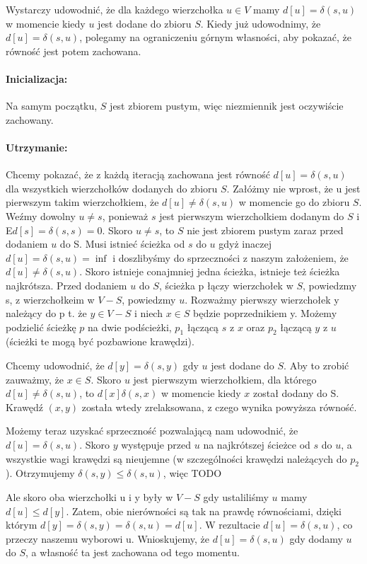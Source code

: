 Wystarczy udowodnić, że dla każdego wierzchołka $u \in V$ mamy $d[u] = \delta(s, u)$ w momencie
kiedy $u$ jest dodane do zbioru $S$. Kiedy już udowodnimy, że $d[u] = \delta(s, u)$,
polegamy na ograniczeniu górnym własności, aby pokazać, że równość jest potem zachowana.

\paragraph{Inicializacja:} Na samym początku, $S$ jest zbiorem pustym, więc niezmiennik jest oczywiście
zachowany.

\paragraph{Utrzymanie:} Chcemy pokazać, że z każdą iteracją zachowana jest równość $d[u] = \delta(s, u)$
dla wszystkich wierzchołków dodanych do zbioru $S$. Załóżmy nie wprost, że u jest
pierwszym takim wierzchołkiem, że $d[u] \ne \delta(s,u)$ w momencie go do zbioru
$S$. Weźmy dowolny $u \ne s$, ponieważ  $s$ jest pierwszym wierzcholkiem dodanym
do $S$ i E$d[s] = \delta(s,s) = 0$. Skoro $u \ne s$, to $S$ nie jest zbiorem pustym
zaraz przed dodaniem $u$ do S. Musi istnieć ścieżka od $s$ do $u$ gdyż inaczej
$d[u] = \delta(s,u) = \inf$ i doszlibyśmy do sprzeczności z naszym założeniem, że
$d[u] \ne \delta(s, u)$. Skoro istnieje conajmniej jedna ścieżka, istnieje też ścieżka
najkrótsza. Przed dodaniem $u$ do $S$, ścieżka p łączy wierzchołek w $S$, powiedzmy s,
z wierzchołkeim w $V - S$, powiedzmy $u$. Rozważmy pierwszy wierzchołek y należący do p
t. że $y \in V - S$ i niech $x \in S$ będzie poprzednikiem y. Możemy podzielić ścieżkę
$p$ na dwie podścieżki, $p_1$ łączącą $s$ z $x$ oraz $p_2$ łączącą $y$ z $u$
(ścieżki te mogą być pozbawione krawędzi).

Chcemy udowodnić, że $d[y] = \delta(s,y)$ gdy $u$ jest dodane do $S$. Aby to zrobić
zauważmy, że $x \in S$. Skoro $u$ jest pierwszym wierzchołkiem, dla którego $d[u] \ne \delta(s,u)$,
to $d[x] \delta(s,x)$ w momencie kiedy $x$ został dodany do S. Krawędź $(x, y)$
została wtedy zrelaksowana, z czego wynika powyższa równość.

Możemy teraz uzyskać sprzeczność pozwalającą nam udowodnić, że $d[u] = \delta(s,u)$.
Skoro $y$ występuje przed $u$ na najkrótszej ścieżce od $s$ do $u$, a wszystkie
wagi krawędzi są nieujemne (w szczególności krawędzi należących do $p_2$). Otrzymujemy
$\delta(s, y) \le \delta(s, u)$, więc
TODO

Ale skoro oba wierzchołki u i y były w $V - S$ gdy ustaliliśmy $u$ mamy $d[u] \le d[y]$.
Zatem, obie nierówności są tak na prawdę równościami, dzięki którym $d[y] = \delta(s, y) = \delta(s, u) = d[u]$.
W rezultacie $d[u] = \delta(s,u)$, co przeczy naszemu wyborowi u. Wnioskujemy, że
$d[u] = \delta(s, u)$ gdy dodamy $u$ do $S$, a własność ta jest zachowana od tego momentu.

